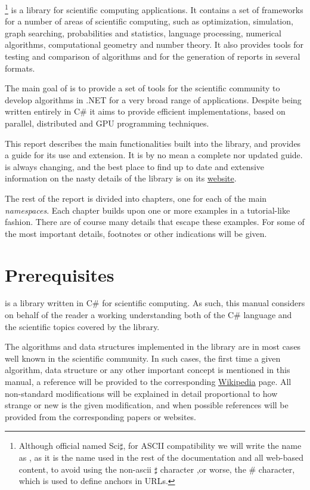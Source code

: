 \sct\footnote{Although official named Sci$\sharp$, for ASCII compatibility
we will write the name as \sct, as it is the name used in the
rest of the documentation and all web-based content, to avoid using
the non-ascii $\sharp$ character ,or worse, the \# character, which
is used to define anchors in URLs.} is a \cs library for scientific computing applications.
It contains a set of frameworks for a number of areas of scientific
computing, such as optimization, simulation, graph searching, 
probabilities and statistics, language processing, numerical algorithms,
computational geometry and number theory. It also provides tools for
testing and comparison of algorithms and for the generation of 
reports in several formats.

The main goal of \sct is to provide a set of tools for
the scientific community to develop algorithms in .NET for 
a very broad range of applications. Despite
being written entirely in C\# it aims to provide efficient
implementations, based on parallel, distributed and GPU programming
techniques. 

This report describes the main functionalities built into
the library, and provides a guide for its use and extension.
It is by no mean a complete nor updated guide. \sct
is always changing, and the best place to find up to date and
extensive information on the nasty details of the library
is on its \href{http://scientifictools.codeplex.com}{website}.

The rest of the report is divided into chapters, one for each
of the \sct main \emph{namespaces}. Each chapter builds upon
one or more examples in a tutorial-like fashion. There are
of course many details that escape these examples. For some
of the most important details, footnotes or other indications will
be given.

\section*{Prerequisites}

\sct is a library written in C\# for scientific computing. As
such, this manual considers on behalf of the reader a working
understanding both of the C\# language and the scientific topics
covered by the library. 

The algorithms and data structures implemented in the library
are in most cases well known in the scientific community.
In such cases, the first time a given algorithm, data structure
or any other important concept is mentioned in this manual, a
reference will be provided to the corresponding 
\href{http://en.wikipedia.org}{Wikipedia} page. All non-standard
modifications will be explained in detail proportional to
how strange or new is the given modification, and when possible
references will be provided from the corresponding papers or
websites.

